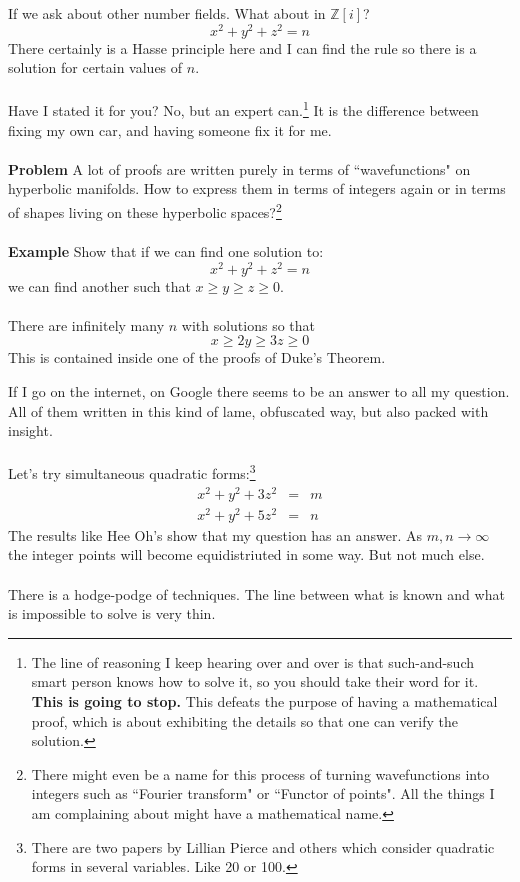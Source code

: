 \documentclass[12pt]{article}
\begin{document}
\newpage

\noindent If we ask about other number fields. What about in $\mathbb{Z}[i]$? 
$$ x^2 + y^2 + z^2 = n  $$
There certainly is a Hasse principle here and I can find the rule so there is a solution for certain values of $n$.  \\ \\ Have I stated it for you? No, but an expert can.\footnote{
The line of reasoning I keep hearing over and over is that such-and-such smart person knows how to solve it, so you should take their word for it.  \textbf{This is going to stop.}  This defeats the purpose of having a mathematical proof, which is about exhibiting the details so that one can verify the solution.}  It is the difference between fixing my own car, and having someone fix it for me. \\ \\
\textbf{Problem} A lot of proofs are written purely in terms of ``wavefunctions" on hyperbolic manifolds.  How to express them in terms of integers again or in terms of shapes living on these hyperbolic spaces?\footnote{There might even be a name for this process of turning wavefunctions into integers such as ``Fourier transform" or ``Functor of points".  All the things I am complaining about might have a mathematical name.} \\ \\
\textbf{Example}  Show that if we can find one solution to:
$$ x^2 + y^2 + z^2 = n$$
we can find another such that $x \geq y \geq z \geq 0$. \\ \\
There are infinitely many $n$ with solutions so that $$x \geq 2y \geq 3z \geq 0$$  This is contained inside one of the proofs of Duke's Theorem.

\newpage

\noindent If I go on the internet, on Google there seems to be an answer to all my question.  All of them written in this kind of lame, obfuscated way, but also packed with insight. \\ \\
Let's try simultaneous quadratic forms:\footnote{There are two papers by Lillian Pierce and others which consider quadratic forms in several variables. Like 20 or 100.}
\begin{eqnarray*}
 x^2 + y^2 + 3z^2 &=& m \\
 x^2 + y^2 + 5z^2 &=& n 
\end{eqnarray*}
The results like Hee Oh's show that my question has an answer.  As $m,n \to \infty$ the integer points will become equidistriuted in some way.  But not much else.  \\ \\
There is a hodge-podge of techniques.  The line between what is known and what is impossible to solve is very thin.
\end{document}

